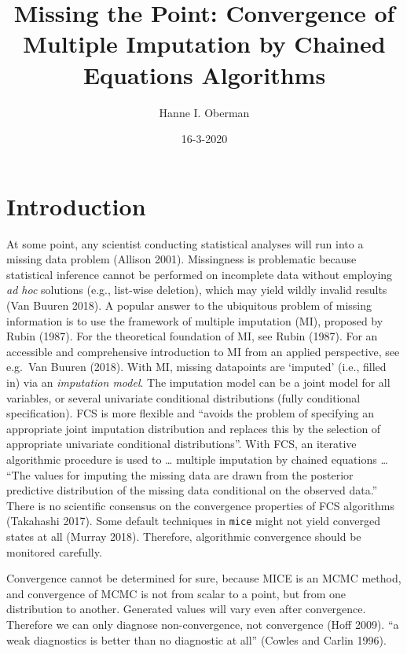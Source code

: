 \documentclass[
  Royal, times, sageapa]{sagej}
\title{Missing the Point: Convergence of Multiple Imputation by Chained
Equations Algorithms}
\author{Hanne I. Oberman}
\date{16-3-2020}
\begin{document}
\maketitle

\hypertarget{introduction}{%
\section{Introduction}\label{introduction}}

At some point, any scientist conducting statistical analyses will run
into a missing data problem (Allison 2001). Missingness is problematic
because statistical inference cannot be performed on incomplete data
without employing \emph{ad hoc} solutions (e.g., list-wise deletion),
which may yield wildly invalid results (Van Buuren 2018). A popular
answer to the ubiquitous problem of missing information is to use the
framework of multiple imputation (MI), proposed by Rubin (1987). For the
theoretical foundation of MI, see Rubin (1987). For an accessible and
comprehensive introduction to MI from an applied perspective, see
e.g.~Van Buuren (2018). With MI, missing datapoints are `imputed' (i.e.,
filled in) via an \emph{imputation model}. The imputation model can be a
joint model for all variables, or several univariate conditional
distributions (fully conditional specification). FCS is more flexible
and ``avoids the problem of specifying an appropriate joint imputation
distribution and replaces this by the selection of appropriate
univariate conditional distributions''. With FCS, an iterative
algorithmic procedure is used to \ldots{} multiple imputation by chained
equations \ldots{} ``The values for imputing the missing data are drawn
from the posterior predictive distribution of the missing data
conditional on the observed data.'' There is no scientific consensus on
the convergence properties of FCS algorithms (Takahashi 2017). Some
default techniques in \texttt{mice} might not yield converged states at
all (Murray 2018). Therefore, algorithmic convergence should be
monitored carefully.

Convergence cannot be determined for sure, because MICE is an MCMC
method, and convergence of MCMC is not from scalar to a point, but from
one distribution to another. Generated values will vary even after
convergence. Therefore we can only diagnose non-convergence, not
convergence (Hoff 2009). ``a weak diagnostics is better than no
diagnostic at all'' (Cowles and Carlin 1996).
\end{document}
